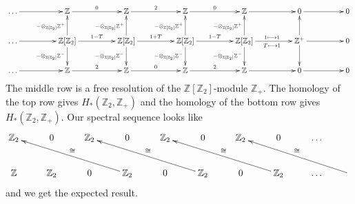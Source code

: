 \documentclass[11pt]{article}
\begin{document}
\begin{Jandr SSS notes}
\[\xymatrixcolsep{4pc}\xymatrix{\ldots\ar[r]
&\mathbb{Z}\ar[r]^0 
&\mathbb{Z}\ar[r]^2
&\mathbb{Z}\ar[r]^0
&\mathbb{Z}\ar[r]
&0\ar[r] & 0\\
\ldots\ar[r]
&\mathbb{Z}[\mathbb{Z}_2]\ar[r]^{1-T}
\ar[d]_{-\otimes_{\mathbb{Z}[\mathbb{Z}_2]}\mathbb{Z}^-} 
\ar[u]^{-\otimes_{\mathbb{Z}[\mathbb{Z}_2]}\mathbb{Z}^+} 
&\mathbb{Z}[\mathbb{Z}_2]\ar[r]^{1+T}
\ar[d]_{-\otimes_{\mathbb{Z}[\mathbb{Z}_2]}\mathbb{Z}^-} 
\ar[u]^{-\otimes_{\mathbb{Z}[\mathbb{Z}_2]}\mathbb{Z}^+} 
&\mathbb{Z}[\mathbb{Z}_2]\ar[r]^{1-T}
\ar[d]_{-\otimes_{\mathbb{Z}[\mathbb{Z}_2]}\mathbb{Z}^-} 
\ar[u]^{-\otimes_{\mathbb{Z}[\mathbb{Z}_2]}\mathbb{Z}^+} 
&\mathbb{Z}[\mathbb{Z}_2]\ar[r]^{1\mapsto 1}_{T\mapsto 1}
\ar[d]_{-\otimes_{\mathbb{Z}[\mathbb{Z}_2]}\mathbb{Z}^-} 
\ar[u]^{-\otimes_{\mathbb{Z}[\mathbb{Z}_2]}\mathbb{Z}^+} 
&\mathbb{Z}^+\ar[r]\ar[d]\ar[u] & 0\\
\ldots\ar[r]
&\mathbb{Z}\ar[r]^2 
&\mathbb{Z}\ar[r]^0
&\mathbb{Z}\ar[r]^2
&\mathbb{Z}\ar[r]
&0\ar[r] & 0}
\]
The middle row is a free resolution of the $\mathbb{Z}[\mathbb{Z}_2]$-module $\mathbb{Z}_+$. The homology of the top row gives $H_*(\mathbb{Z}_2,\mathbb{Z}_+)$ and the homology of the bottom row gives $H_*(\mathbb{Z}_2,\mathbb{Z_+})$. Our spectral sequence looks like
\[\xymatrix{\mathbb{Z}_2 & 0 & \mathbb{Z}_2 & 0 & \mathbb{Z}_2 & 0 & \mathbb{Z}_2 & 0 & \ldots &\\
\mathbb{Z} & \mathbb{Z}_2 & 0 & \mathbb{Z}_2\ar[lllu]_{\cong} & 0 & \mathbb{Z}_2\ar[lllu]_{\cong} & 0 & \mathbb{Z}_2\ar[lllu]_{\cong} & \ldots & \ar[lllu]_{\cong}}\]
and we get the expected result.



\end{Jandr SSS notes}
\end{document}
